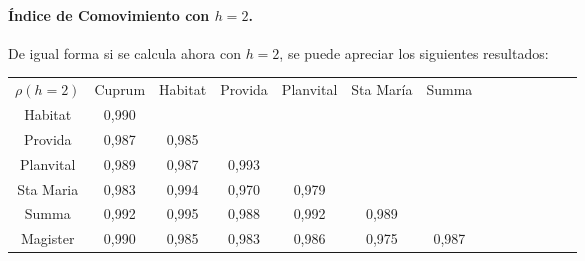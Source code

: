 \paragraph{\'Indice de Comovimiento con $h=2$.}

De igual forma si se calcula ahora con $h=2$, se puede apreciar los siguientes resultados:

\begin{center}
\begin{small}
\begin{tabular}{|l|l|l|l|l|l|l|lllllll}
\cline{1-7}
\multicolumn{1}{|c|}{$\rho(h=2)$} & \multicolumn{1}{c|}{Cuprum} & \multicolumn{1}{c|}{Habitat} & \multicolumn{1}{c|}{Provida} & \multicolumn{1}{c|}{Planvital} & \multicolumn{1}{c|}{Sta Mar\'ia} & \multicolumn{1}{c|}{Summa} &  &  &  &  &  &  &  \\
\cline{1-7}
\multicolumn{1}{|c|}{Habitat} & \multicolumn{1}{c|}{0,990} & \multicolumn{1}{c|}{} & \multicolumn{1}{c|}{} & \multicolumn{1}{c|}{} & \multicolumn{1}{c|}{} & \multicolumn{1}{c|}{} &  &  &  &  &  &  &  \\
\cline{1-7}
\multicolumn{1}{|c|}{Provida} & \multicolumn{1}{c|}{0,987} & \multicolumn{1}{c|}{0,985} & \multicolumn{1}{c|}{} & \multicolumn{1}{c|}{} & \multicolumn{1}{c|}{} & \multicolumn{1}{c|}{} &  &  &  &  &  &  &  \\
\cline{1-7}
\multicolumn{1}{|c|}{Planvital} & \multicolumn{1}{c|}{0,989} & \multicolumn{1}{c|}{0,987} & \multicolumn{1}{c|}{0,993} & \multicolumn{1}{c|}{} & \multicolumn{1}{c|}{} & \multicolumn{1}{c|}{} &  &  &  &  &  &  &  \\
\cline{1-7}
\multicolumn{1}{|c|}{Sta Maria} & \multicolumn{1}{c|}{0,983} & \multicolumn{1}{c|}{0,994} & \multicolumn{1}{c|}{0,970} & \multicolumn{1}{c|}{0,979} & \multicolumn{1}{c|}{} & \multicolumn{1}{c|}{} &  &  &  &  &  &  &  \\
\cline{1-7}
\multicolumn{1}{|c|}{Summa} & \multicolumn{1}{c|}{0,992} & \multicolumn{1}{c|}{0,995} & \multicolumn{1}{c|}{0,988} & \multicolumn{1}{c|}{0,992} & \multicolumn{1}{c|}{0,989} & \multicolumn{1}{c|}{} &  &  &  &  &  &  &  \\
\cline{1-7}
\multicolumn{1}{|c|}{Magister} & \multicolumn{1}{c|}{0,990} & \multicolumn{1}{c|}{0,985} & \multicolumn{1}{c|}{0,983} & \multicolumn{1}{c|}{0,986} & \multicolumn{1}{c|}{0,975} & \multicolumn{1}{c|}{0,987} &  &  &  &  &  &  &  \\
\cline{1-7}
\end{tabular}
\end{small}
\end{center}


